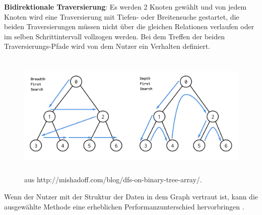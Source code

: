 \textbf {Bidirektionale Traversierung}: Es werden 2 Knoten gewählt und von jedem Knoten wird eine Traversierung  mit Tiefen- oder Breitensuche gestartet, die beiden Traversierungen müssen nicht über die gleichen Relationen verlaufen oder im selben Schrittintervall vollzogen werden. Bei dem Treffen der beiden Traversierungs-Pfade wird von dem Nutzer ein Verhalten definiert.
\FloatBarrier
\begin{figure}[!htb]
	\centering
	\includegraphics [width=14cm, height=6cm]{Figures/search}
	\caption[Breiten- und Tiefensuche]{ aus http://mishadoff.com/blog/dfs-on-binary-tree-array/.}
	\label{fig:Search}
\end{figure} 
\FloatBarrier
\noindent Wenn der Nutzer mit der Struktur der Daten in dem Graph vertraut ist, kann die ausgewählte Methode eine erheblichen Performanzunterschied  hervorbringen \parencite{vukotic2015neo4j}. 

